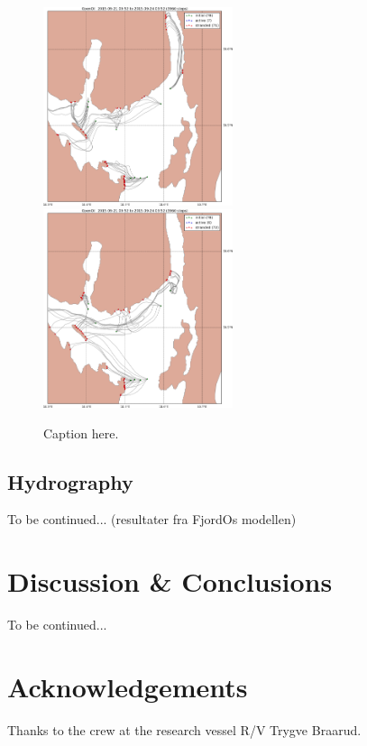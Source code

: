 \documentclass[12pt,a4paper,english]{article}
\begin{document}
\begin{figure}[ht]
\centerline{
\includegraphics*[width=0.495\textwidth]{Opendrift_simulations/LTR3/tokt_drifters_winddrift_0p5_radius_0_num_6_plusminus_2p5h_crop}
\includegraphics*[width=0.495\textwidth]{Opendrift_simulations/LTR3/tokt_drifters_winddrift_0p5_radius_0_num_6_plusminus_2p5h_norkyst_crop}
}
\caption{\small
Caption here.
}
\label{fig:opendriftD2}
\end{figure}


\subsection{Hydrography}

To be continued... (resultater fra FjordOs modellen)

\clearpage

\section{Discussion \& Conclusions}

To be continued...


\clearpage
\section*{\hspace{17mm}Acknowledgements}
Thanks to the crew at the research vessel R/V Trygve Braarud.
\end{document}
